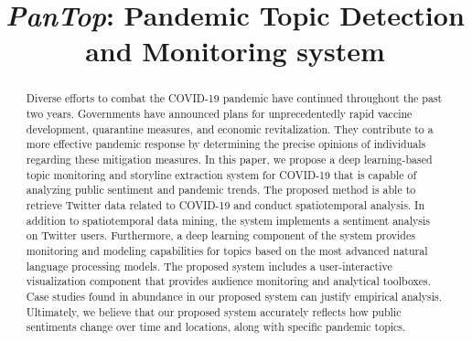 \documentclass[conference]{IEEEtran}
\begin{document}
\title{{\it PanTop}: Pandemic Topic Detection and Monitoring system}



\author{
}

\maketitle

\begin{abstract} 
Diverse efforts to combat the COVID-19 pandemic have continued throughout the
past two years. Governments have announced plans for unprecedentedly rapid
vaccine development, quarantine measures, and economic revitalization. They
contribute to a more effective pandemic response by determining the precise
opinions of individuals regarding these mitigation measures. In this paper,
we propose a deep learning-based topic monitoring and storyline extraction
system for COVID-19 that is capable of analyzing public sentiment and
pandemic trends. The proposed method is able to retrieve Twitter data related
to COVID-19 and conduct spatiotemporal analysis. In addition to
spatiotemporal data mining, the system implements a sentiment analysis on
Twitter users. Furthermore, a deep learning component of the system provides
monitoring and modeling capabilities for topics based on the most advanced
natural language processing models. The proposed system includes a
user-interactive visualization component that provides audience monitoring
and analytical toolboxes. Case studies found in abundance in our proposed
system can justify empirical analysis. Ultimately, we believe that our
proposed system accurately reflects how public sentiments change over time
and locations, along with specific pandemic topics. 
\end{abstract}
\end{document}
